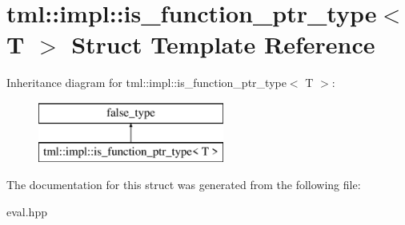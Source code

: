 \hypertarget{structtml_1_1impl_1_1is__function__ptr__type}{\section{tml\+:\+:impl\+:\+:is\+\_\+function\+\_\+ptr\+\_\+type$<$ T $>$ Struct Template Reference}
\label{structtml_1_1impl_1_1is__function__ptr__type}
}
Inheritance diagram for tml\+:\+:impl\+:\+:is\+\_\+function\+\_\+ptr\+\_\+type$<$ T $>$\+:\begin{figure}[H]
\begin{center}
\leavevmode
\includegraphics[height=2.000000cm]{structtml_1_1impl_1_1is__function__ptr__type}
\end{center}
\end{figure}


The documentation for this struct was generated from the following file\+:\begin{DoxyCompactItemize}
\item 
eval.\+hpp\end{DoxyCompactItemize}
